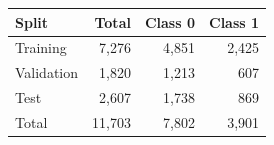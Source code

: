 \begin{tabular}{lrrr}
\toprule
Split & Total & Class 0 & Class 1\\
\midrule
Training & 7,276 & 4,851 & 2,425\\
Validation & 1,820 & 1,213 & 607\\
Test & 2,607 & 1,738 & 869\\
Total & 11,703 & 7,802 & 3,901\\
\bottomrule
\end{tabular}